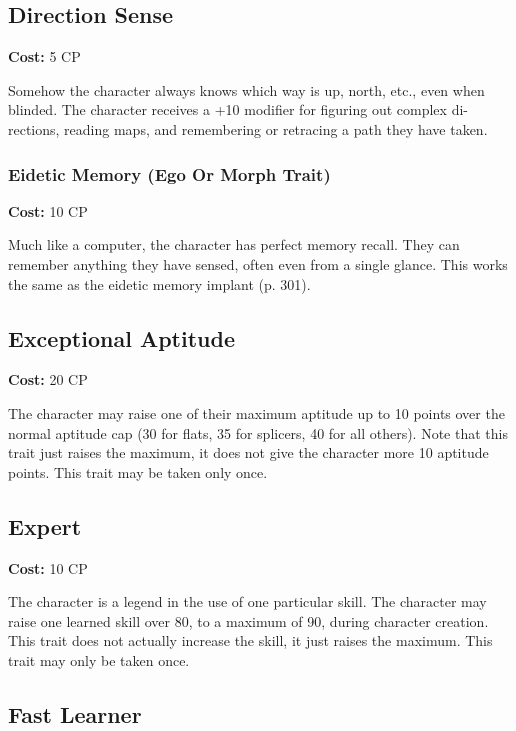 \subsection{Direction Sense}
\label{sec:traits-direction-sense}

\textbf{Cost:} 5 CP

Somehow the character always knows which way is up, north, etc., even when blinded. The character receives a +10 modifier for figuring out complex di- rections, reading maps, and remembering or retracing a path they have taken.


\subsubsection{Eidetic Memory (Ego Or Morph Trait)}
\label{sec:traits-eidetic-memory}
\textbf{Cost:} 10 CP

Much like a computer, the character has perfect memory recall. They can remember anything they have sensed, often even from a single glance. This works the same as the eidetic memory implant (p. 301).

\subsection{Exceptional Aptitude}
\label{sec:traits-exceptional-aptitude}

\textbf{Cost:} 20 CP

The character may raise one of their maximum aptitude up to 10 points over the normal aptitude cap (30 for flats, 35 for splicers, 40 for all others). Note that this trait just raises the maximum, it does not give the character more 10 aptitude points. This trait may be taken only once.

\subsection{Expert}
\label{sec:traits-expert}

\textbf{Cost:} 10 CP

The character is a legend in the use of one particular skill. The character may raise one learned skill over 80, to a maximum of 90, during character creation. This trait does not actually increase the skill, it just raises the maximum. This trait may only be taken once.

\subsection{Fast Learner}
\label{sec:traits-fast-learnier}

